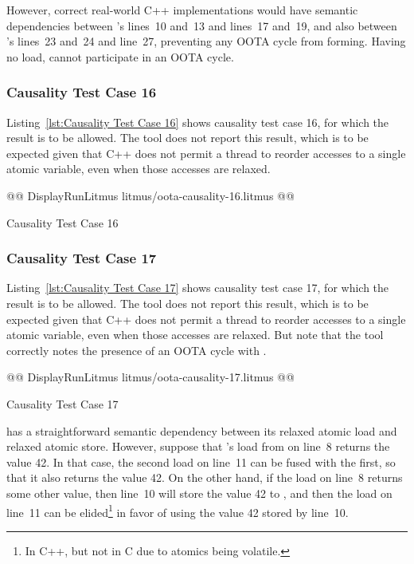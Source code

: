 \documentclass[10]{article}
\begin{document}
However, correct real-world C++ implementations would have semantic
dependencies between 's lines~10 and~13 and lines~17 and~19, and also
between 's lines~23 and~24 and line~27, preventing any
OOTA cycle from forming.
Having no load,  cannot participate in an OOTA cycle.

\subsubsection{Causality Test Case 16}
\label{app:Causality Test Case 16}

Listing~\ref{lst:Causality Test Case 16}
shows causality test case 16, for which the 
result is to be allowed.
The  tool does not report this result, which is to be expected
given that C++ does not permit a thread to reorder accesses to a single
atomic variable, even when those accesses are relaxed.

\begin{listing}[tbp]
@@ DisplayRunLitmus litmus/oota-causality-16.litmus @@
\caption{Causality Test Case 16}
\label{lst:Causality Test Case 16}
\end{listing}

\subsubsection{Causality Test Case 17}
\label{app:Causality Test Case 17}

Listing~\ref{lst:Causality Test Case 17}
shows causality test case 17, for which the 
result is to be allowed.
The  tool does not report this result, which is to be expected
given that C++ does not permit a thread to reorder accesses to a single
atomic variable, even when those accesses are relaxed.
But note that the  tool correctly notes the presence of an
OOTA cycle with .

\begin{listing}[tbp]
@@ DisplayRunLitmus litmus/oota-causality-17.litmus @@
\caption{Causality Test Case 17}
\label{lst:Causality Test Case 17}
\end{listing}

 has a straightforward semantic dependency between its
relaxed atomic load and relaxed atomic store.
However, suppose that 's load from  on line~8 returns
the value 42.
In that case, the second load on line~11 can be fused with the first,
so that it also returns the value 42.
On the other hand, if the load on line~8 returns some other value, then
line~10 will store the value 42 to , and then the load on line~11
can be elided\footnote{
	In C++, but not in C due to atomics being volatile.}
in favor of using the value 42 stored by line~10.
\end{document}
